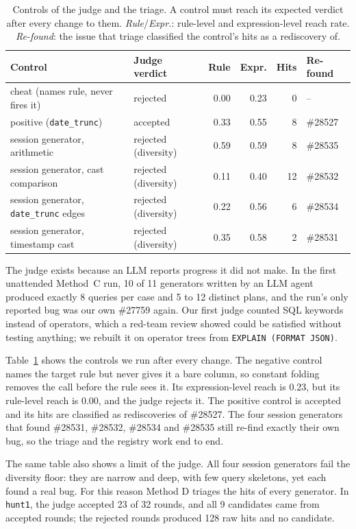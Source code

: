\begin{table}[t]
\caption{Controls of the judge and the triage. A control must reach its expected verdict after every change to them.
\emph{Rule}/\emph{Expr.}: rule-level and expression-level reach rate. \emph{Re-found}: the issue that triage classified the
control's hits as a rediscovery of.}
\label{tab:controls}
\footnotesize\centering
\begin{tabular}{llrrrl}
\toprule
Control & Judge verdict & Rule & Expr. & Hits & Re-found \\
\midrule
cheat (names rule, never fires it) & rejected & 0.00 & 0.23 & 0 & -- \\
positive (\texttt{date\_trunc}) & accepted & 0.33 & 0.55 & 8 & \#28527 \\
session generator, arithmetic & rejected (diversity) & 0.59 & 0.59 & 8 & \#28535 \\
session generator, cast comparison & rejected (diversity) & 0.11 & 0.40 & 12 & \#28532 \\
session generator, \texttt{date\_trunc} edges & rejected (diversity) & 0.22 & 0.56 & 6 & \#28534 \\
session generator, timestamp cast & rejected (diversity) & 0.35 & 0.58 & 2 & \#28531 \\
\bottomrule
\end{tabular}
\end{table}

The judge exists because an LLM reports progress it did not make. In the first unattended Method~C run, 10 of 11
generators written by an LLM agent produced exactly 8 queries per case and 5 to 12 distinct plans, and the run's only
reported bug was our own \#27759 again. Our first judge counted SQL keywords instead of operators, which a red-team
review showed could be satisfied without testing anything; we rebuilt it on operator trees from
\texttt{EXPLAIN (FORMAT JSON)}.

Table~\ref{tab:controls} shows the controls we run after every change. The negative control names the target rule but
never gives it a bare column, so constant folding removes the call before the rule sees it. Its expression-level reach
is 0.23, but its rule-level reach is 0.00, and the judge rejects it. The positive control is accepted and its hits are
classified as rediscoveries of \#28527. The four session generators that found \#28531, \#28532, \#28534 and \#28535
still re-find exactly their own bug, so the triage and the registry work end to end.

The same table also shows a limit of the judge. All four session generators fail the diversity floor: they are narrow
and deep, with few query skeletons, yet each found a real bug. For this reason Method D triages the hits of every
generator. In \texttt{hunt1}, the judge accepted 23 of 32 rounds, and all 9 candidates came from accepted rounds; the rejected rounds produced 128 raw hits and no candidate.

